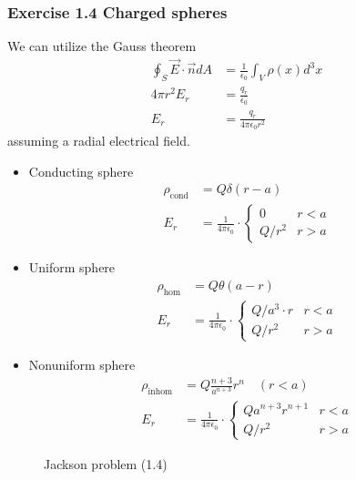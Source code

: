 \documentclass[10pt,a4paper]{book}
\theoremstyle{definition}
\begin{document}
\subsubsection{Exercise 1.4 Charged spheres}
We can utilize the Gauss theorem
\begin{align}
\oint_S\vec{E}\cdot\vec{n}dA&=\frac{1}{\epsilon_0}\int_V\rho(x)d^3x\\
4\pi r^2E_r&=\frac{q_r}{\epsilon_0}\\
E_r&=\frac{q_r}{4\pi\epsilon_0r^2}
\end{align}
assuming a radial electrical field.
\begin{itemize}
\item Conducting sphere
\begin{align}
\rho_\text{cond}&=Q\delta(r-a)\\
E_r&=\frac{1}{4\pi\epsilon_0}\cdot\left\{
\begin{array}{ll}
0 & r<a\\
Q/r^2 & r>a
\end{array}
\right.
\end{align}

\item Uniform sphere
\begin{align}
\rho_\text{hom}&=Q\theta(a-r)\\
E_r&=\frac{1}{4\pi\epsilon_0}\cdot\left\{
\begin{array}{ll}
Q/a^3\cdot r & r<a\\
Q/r^2 & r>a
\end{array}
\right.
\end{align}

\item Nonuniform sphere
\begin{align}
\rho_\text{inhom}&=Q\frac{n+3}{a^{n+3}}r^n\quad(r<a)\\
E_r&=\frac{1}{4\pi\epsilon_0}\cdot\left\{
\begin{array}{ll}
Qa^{n+3}r^{n+1} & r<a\\
Q/r^2 & r>a
\end{array}
\right.
\end{align}
\end{itemize}
\begin{figure}[!h]
\centering
{}
\caption{Jackson problem (1.4)}
\end{figure}
\end{document}
